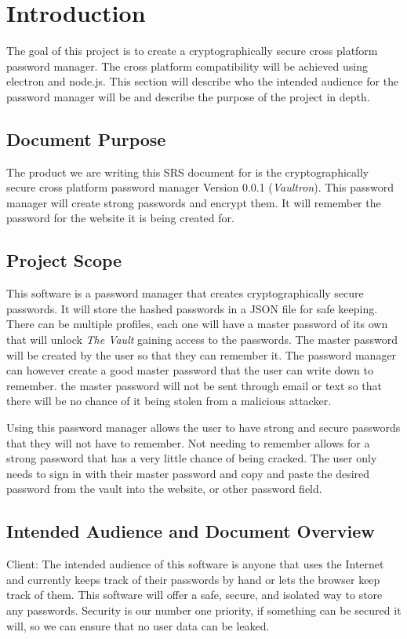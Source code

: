\documentclass[11pt]{report}
\begin{document}
\clearpage


\tableofcontents{}

\chapter{Introduction}
The goal of this project is to create a cryptographically
secure cross platform password manager. The cross platform
compatibility will be achieved using electron and node.js.
This section will describe who the intended audience for the
password manager will be and describe the purpose of the
project in depth.


\section{Document Purpose}
The product we are writing this SRS document for is the cryptographically
secure cross platform password manager Version 0.0.1 (\textit{Vaultron}). This password manager 
will create strong passwords and encrypt them. It will remember the password 
for the website it is being created for.


\section{Project Scope}
This software is a password manager that creates cryptographically secure 
passwords. It will store the hashed passwords in a JSON file for safe keeping.
There can be multiple profiles, each one will have a master password of its own 
that will unlock \textit{The Vault} gaining access to the passwords. The master password
will be created by the user so that they can remember it. The password manager 
can however create a good master password that the user can write down to remember.
the master password will not be sent through email or text so that there will
be no chance of it being stolen from a malicious attacker.

Using this password manager allows the user to have strong and secure passwords 
that they will not have to remember. Not needing to remember allows for a strong 
password that has a very little chance of being cracked. The user only needs to sign
in with their master password and copy and paste the desired password from the 
vault into the website, or other password field.


\section{Intended Audience and Document Overview}
Client: The intended audience of this software is anyone that uses the Internet 
and currently keeps track of their passwords by hand or lets the browser
keep track of them. This software will offer a safe, secure, and isolated
way to store any passwords. Security is our number one priority, if something
can be secured it will, so we can ensure that no user data can be leaked.
\end{document}
